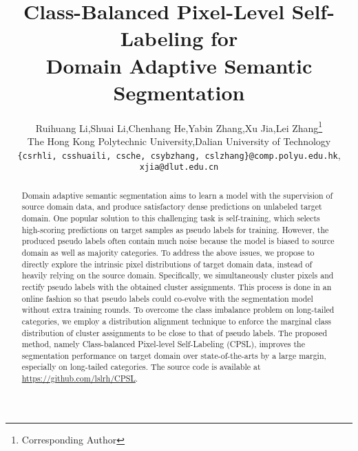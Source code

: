 \documentclass[10pt,twocolumn,letterpaper]{article}
\begin{document}
	
\title{Class-Balanced Pixel-Level Self-Labeling for \\ Domain Adaptive Semantic Segmentation}
	
	\author{Ruihuang Li,\quad Shuai Li,\quad Chenhang He,\quad Yabin Zhang,\quad Xu Jia,\quad Lei Zhang\thanks{Corresponding Author}\\
	The Hong Kong Polytechnic
University,\quad Dalian University of Technology\\
{\tt\small \{csrhli, csshuaili, csche, csybzhang, cslzhang\}@comp.polyu.edu.hk}, {\tt\small xjia@dlut.edu.cn} 
}
	


	\maketitle
	
\begin{abstract}
		Domain adaptive semantic segmentation aims to learn a model with the supervision of source domain data, and produce satisfactory dense predictions on unlabeled target domain. One popular solution to this challenging task is self-training, which selects high-scoring predictions on target samples as pseudo labels for training. However, the produced pseudo labels often contain much noise because the model is biased to source domain as well as majority categories. To address the above issues, we propose to directly explore the intrinsic pixel distributions of target domain data, instead of heavily relying on the source domain. Specifically, we simultaneously cluster pixels and rectify pseudo labels with the obtained cluster assignments. This process is done in an online fashion so that pseudo labels could co-evolve with the segmentation model without extra training rounds. To overcome the class imbalance problem on long-tailed categories, we employ a distribution alignment technique to enforce the marginal class distribution of cluster assignments to be close to that of pseudo labels. The proposed method, namely Class-balanced Pixel-level Self-Labeling (CPSL), improves the segmentation performance on target domain over state-of-the-arts by a large margin, especially on long-tailed categories. The source code is available at \url{https://github.com/lslrh/CPSL}. 


	\end{abstract}
\end{document}
